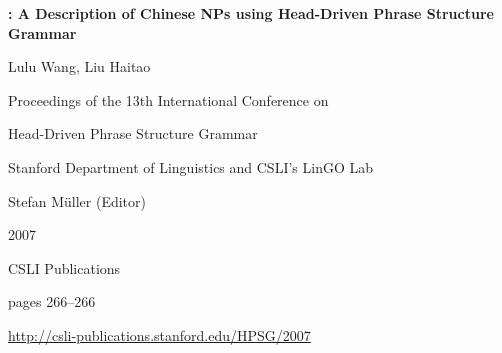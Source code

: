 \documentclass[a4paper,11pt]{article}
\begin{document}
\begin{center}
  {\huge\bf : A Description of Chinese NPs using Head-Driven Phrase Structure Grammar\par}

  \bigskip

  {\LARGE Lulu Wang, Liu Haitao\par}

  \vspace*{3\bigskipamount}

  Proceedings of the 13th International Conference on\par Head-Driven Phrase Structure Grammar

  \bigskip

  Stanford Department of Linguistics and CSLI's LinGO Lab

  \medskip

  Stefan Müller (Editor)

  \medskip

  2007

  \medskip

  CSLI Publications

  \medskip

  pages 266--266

  \medskip

  \url{http://csli-publications.stanford.edu/HPSG/2007}
\end{center}

\newpage

        
\end{document}
